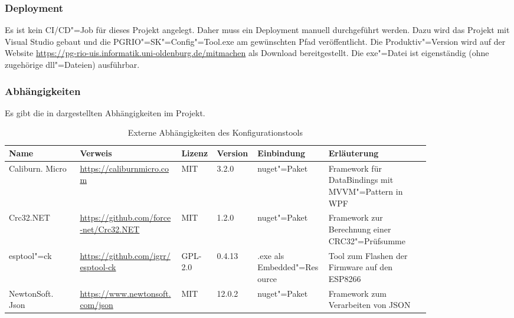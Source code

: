 \subsubsection{Deployment}
Es ist kein CI/CD"=Job für dieses Projekt angelegt.
Daher muss ein Deployment manuell durchgeführt werden.
Dazu wird das Projekt mit Visual Studio gebaut und die PGRIO"=SK"=Config"=Tool.exe am gewünschten Pfad veröffentlicht.
Die Produktiv"=Version wird auf der Website \url{https://pg-rio-uis.informatik.uni-oldenburg.de/mitmachen} als Download bereitgestellt.
Die exe"=Datei ist eigenständig (ohne zugehörige dll"=Dateien) ausführbar.

\subsubsection{Abhängigkeiten}
Es gibt die in  dargestellten Abhängigkeiten im Projekt.

\begin{table}[htb]
	\caption{Externe Abhängigkeiten des Konfigurationstools}
	\begin{tabular}{|p{0.14\linewidth}|p{0.20\linewidth}|p{0.07\linewidth}|p{0.08\linewidth}|p{0.14\linewidth}|p{0.20\linewidth}|}
		\hline
		Name & Verweis & Lizenz & Version & Einbindung & Erläuterung \\ \hline
		Caliburn. Micro & \url{https://caliburnmicro.com} & MIT & 3.2.0 & nuget"=Paket & Framework für DataBindings mit MVVM"=Pattern in WPF \\ \hline
		Crc32.NET & \url{https://github.com/force-net/Crc32.NET} & MIT & 1.2.0 & nuget"=Paket & Framework zur Berechnung einer CRC32"=Prüfsumme \\ \hline
		esptool"=ck & \url{https://github.com/igrr/esptool-ck} & GPL-2.0 & 0.4.13 & .exe als Embedded"=Resource & Tool zum Flashen der Firmware auf den ESP8266 \\ \hline
		NewtonSoft. Json & \url{https://www.newtonsoft.com/json} & MIT & 12.0.2 & nuget"=Paket & Framework zum Verarbeiten von JSON \\ \hline
	\end{tabular}
	\label{tbl:skctdependencies}
\end{table}
